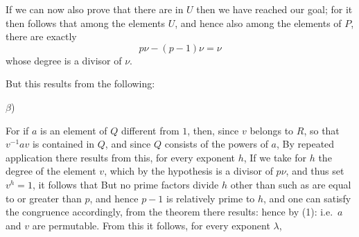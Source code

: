 If we can now also prove that there are in $U$  then we have reached our goal; for it then follows that among the elements $U$, and hence also among the elements of $P$, there are exactly
\[
p\nu - (p-1)\nu = \nu
\]
whose degree is a divisor of $\nu$.

But this results from the following:

$\beta$) 

For if $a$ is an element of $Q$ different from $1$, then, since $v$ belongs to $R$, so that $v^{-1}av$ is contained in $Q$, and since $Q$ consists of the powers of $a$,
By repeated application there results from this, for every exponent $h$,
If we take for $h$ the degree of the element $v$, which by the hypothesis is a divisor of $p\nu$, and thus set $v^h = 1$, it follows that
But no prime factors divide $h$ other than such as are equal to or greater than $p$, and hence $p-1$ is relatively prime to $h$, and one can satisfy the congruence
accordingly, from the  theorem there results:
hence by (1):
i.e.\ $a$ and $v$ are permutable. From this it follows, for every exponent $\lambda$,
